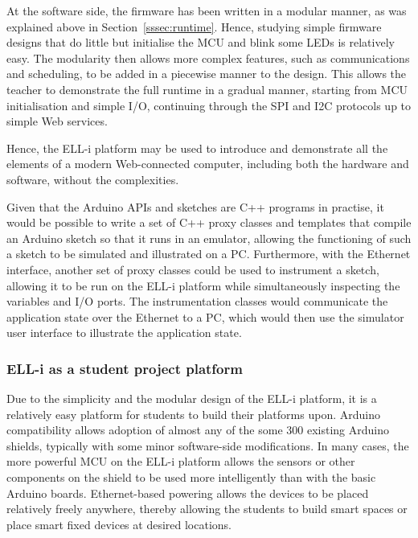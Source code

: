 \documentclass[final]{siamltex}
\begin{document}
At the software side, the firmware has been written in a modular
manner, as was explained above in Section~\ref{sssec:runtime}.  Hence,
studying simple firmware designs that do little but initialise the MCU
and blink some LEDs is relatively easy.  The modularity then allows
more complex features, such as communications and scheduling, to be
added in a piecewise manner to the design.  This allows the teacher to
demonstrate the full runtime in a gradual manner, starting from MCU
initialisation and simple I/O, continuing through the SPI and I2C
protocols up to simple Web services.

Hence, the ELL-i platform may be used to introduce and demonstrate all
the elements of a modern Web-connected computer, including both the
hardware and software, without the complexities.


Given that the Arduino APIs and sketches are C++ programs in practise,
it would be possible to write a set of C++ proxy classes and templates that
compile an Arduino sketch so that it runs in an emulator, allowing the
functioning of such a sketch to be simulated and illustrated on a PC.
Furthermore, with the Ethernet interface, another set of proxy classes
could be used to instrument a sketch, allowing it to be run on the
ELL-i platform while simultaneously inspecting the variables and I/O
ports.  The instrumentation classes would communicate the
application state over the Ethernet to a PC, which would then use the
simulator user interface to illustrate the application state.

\subsubsection{ELL-i as a student project platform}

Due to the simplicity and the modular design of the ELL-i platform, it
is a relatively easy platform for students to build their platforms
upon.  Arduino compatibility allows adoption of almost any of the
some 300 existing Arduino shields, typically with some minor
software-side modifications.  In many cases, the more powerful MCU on
the ELL-i platform allows the sensors or other components on the
shield to be used more intelligently than with the basic Arduino
boards.  Ethernet-based powering allows the devices to be placed
relatively freely anywhere, thereby allowing the students to build
smart spaces or place smart fixed devices at desired locations.
\end{document}
